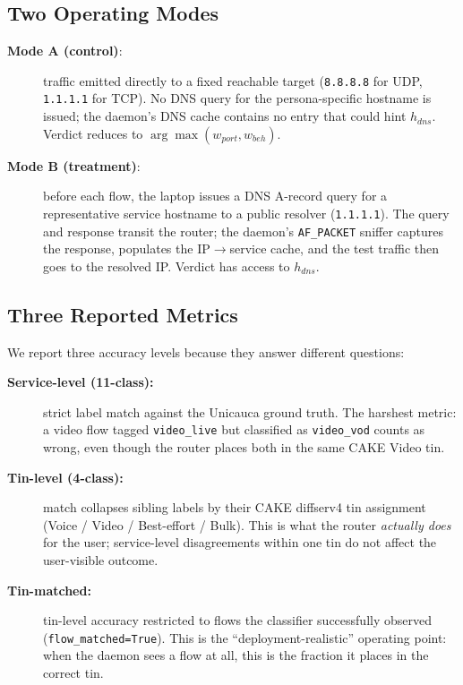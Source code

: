 \documentclass[11pt,a4paper]{article}
\begin{document}
\subsection{Two Operating Modes}

\begin{description}
\item[\textbf{Mode A (control)}:] traffic emitted directly to a fixed
reachable target (\texttt{8.8.8.8} for UDP, \texttt{1.1.1.1} for TCP).
No DNS query for the persona-specific hostname is issued; the daemon's
DNS cache contains no entry that could hint $h_{dns}$. Verdict reduces
to $\arg\max(w_{port}, w_{beh})$.

\item[\textbf{Mode B (treatment)}:] before each flow, the laptop issues
a DNS A-record query for a representative service hostname to a public
resolver (\texttt{1.1.1.1}). The query and response transit the router;
the daemon's \texttt{AF\_PACKET} sniffer captures the response,
populates the IP$\rightarrow$service cache, and the test traffic then
goes to the resolved IP. Verdict has access to $h_{dns}$.
\end{description}

\subsection{Three Reported Metrics}

We report three accuracy levels because they answer different questions:

\begin{description}
\item[\textbf{Service-level (11-class):}] strict label match against
the Unicauca ground truth. The harshest metric: a video flow tagged
\texttt{video\_live} but classified as \texttt{video\_vod} counts as
wrong, even though the router places both in the same CAKE Video tin.

\item[\textbf{Tin-level (4-class):}] match collapses sibling labels by
their CAKE diffserv4 tin assignment (Voice / Video / Best-effort / Bulk).
This is what the router \emph{actually does} for the user; service-level
disagreements within one tin do not affect the user-visible outcome.

\item[\textbf{Tin-matched:}] tin-level accuracy restricted to flows the
classifier successfully observed (\texttt{flow\_matched=True}). This
is the ``deployment-realistic'' operating point: when the daemon sees
a flow at all, this is the fraction it places in the correct tin.
\end{description}
\end{document}

